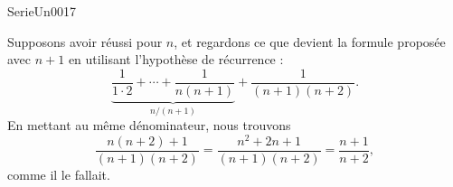 

\begin{corrige}{SerieUn0017}

	Supposons avoir réussi pour $n$, et regardons ce que devient la formule proposée avec $n+1$ en utilisant l'hypothèse de récurrence :
	\begin{equation}
		\underbrace{\frac{1}{ 1\cdot 2}+\cdots+\frac{1}{ n(n+1) }}_{n/(n+1)}+\frac{1}{ (n+1)(n+2) }.
	\end{equation}
	En mettant au même dénominateur, nous trouvons
	\begin{equation}
		\frac{ n(n+2)+1 }{ (n+1)(n+2) }=\frac{ n^2+2n+1 }{ (n+1)(n+2) }=\frac{ n+1 }{ n+2 },
	\end{equation}
	comme il le fallait.

\end{corrige}
